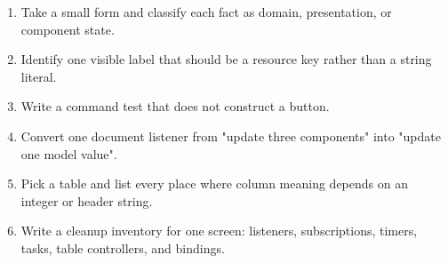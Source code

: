 \begin{exercisebox}
\begin{enumerate}
\item Take a small form and classify each fact as domain, presentation, or component state.
\item Identify one visible label that should be a resource key rather than a string literal.
\item Write a command test that does not construct a button.
\item Convert one document listener from "update three components" into "update one model value".
\item Pick a table and list every place where column meaning depends on an integer or header string.
\item Write a cleanup inventory for one screen: listeners, subscriptions, timers, tasks, table controllers, and bindings.
\end{enumerate}
\end{exercisebox}

